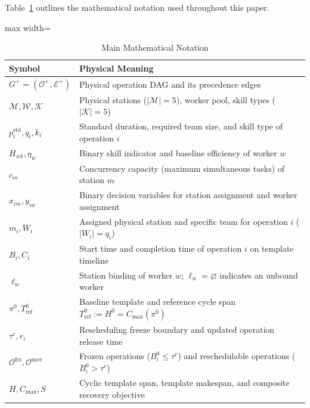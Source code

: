 \documentclass[journal,10pt]{IEEEtran}
\renewcommand{\arraystretch}{1.06}
\begin{document}
Table~\ref{tab:notation} outlines the mathematical notation used throughout this paper.

\begin{table}[!t]
\centering
\caption{Main Mathematical Notation}
\label{tab:notation}
\setlength{\tabcolsep}{3pt}
\renewcommand{\arraystretch}{1.05}
\begin{adjustbox}{max width=\columnwidth}
\begin{tabular}{@{}lp{6.8cm}@{}}
\toprule
\textbf{Symbol} & \textbf{Physical Meaning} \\
\midrule
$G^+=(\mathcal{O}^+,\mathcal{E}^+)$ & Physical operation DAG and its precedence edges \\
$\mathcal{M}, \mathcal{W}, \mathcal{K}$ & Physical stations ($|\mathcal{M}|=5$), worker pool, skill types ($|\mathcal{K}|=5$) \\
$p_i^{\mathrm{std}}, q_i, k_i$ & Standard duration, required team size, and skill type of operation $i$ \\
$H_{wk}, \eta_w$ & Binary skill indicator and baseline efficiency of worker $w$ \\
$c_m$ & Concurrency capacity (maximum simultaneous tasks) of station $m$ \\
$x_{im}, y_{iw}$ & Binary decision variables for station assignment and worker assignment \\
$m_i, W_i$ & Assigned physical station and specific team for operation $i$ ($|W_i|=q_i$) \\
$B_i, C_i$ & Start time and completion time of operation $i$ on template timeline \\
$\ell_w$ & Station binding of worker $w$; $\ell_w=\varnothing$ indicates an unbound worker \\
$\pi^0, T_{\mathrm{ref}}^0$ & Baseline template and reference cycle span $T_{\mathrm{ref}}^0:=H^0=C_{\max}(\pi^0)$ \\
$\tau^r, r_i$ & Rescheduling freeze boundary and updated operation release time \\
$\mathcal{O}^{\mathrm{frz}}, \mathcal{O}^{\mathrm{mov}}$ & Frozen operations ($B_i^0\le\tau^r$) and reschedulable operations ($B_i^0>\tau^r$) \\
$H, C_{\max}, S$ & Cyclic template span, template makespan, and composite recovery objective \\
\bottomrule
\end{tabular}
\end{adjustbox}
\end{table}
\end{document}
